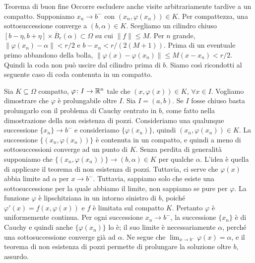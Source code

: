 \documentclass[a4paper]{article}
\begin{document}
\begin{radioactive}
\begin{snippetproof}{Teorema di buon fine}
    Occorre escludere anche visite arbitrariamente tardive a un compatto.
    Supponiamo \(x_n\to b^-\) con \((x_n,\varphi(x_n))\in K\).
    Per compattezza, una sottosuccessione converge a \((b,\alpha)\in K\).
    Scegliamo un cilindro chiuso
    \([b-\eta,b+\eta]\times\overline B_r(\alpha)\subset\Omega\)
    su cui \(\|f\|\leq M\). Per \(n\) grande,
    \(\|\varphi(x_n)-\alpha\|<r/2\) e \(b-x_n<r/(2(M+1))\).
    Prima di un eventuale primo abbandono della bolla,
    \(\|\varphi(x)-\varphi(x_n)\|\leq M(x-x_n)<r/2\).
    Quindi la coda non può uscire dal cilindro prima di \(b\).
    Siamo così ricondotti al seguente caso di coda contenuta in un compatto.

    Sia \(K \subseteq \Omega\) compatto, \(\varphi \colon I \to \mathbb{R}^n\)
    tale che \((x, \varphi(x)) \in K\), \(\forall x \in I\).
    Vogliamo dimostrare che \(\varphi\) è prolungabile oltre \(I\).
    Sia \(I = (a,b)\). Se \(I\) fosse chiuso basta prolungarlo con il problema di Cauchy centrato in \(b\),
    come fatto nella dimostrazione della non esistenza di pozzi.
    Consideriamo una qualunque successione \(\{x_n\} \to b^-\)
    e consideriamo \(\{\varphi(x_n)\}\), quindi \((x_n, \varphi(x_n)) \in K\).
    La successione \(\{(x_n, \varphi(x_n))\}\) è contenuta in un compatto, e quindi
    a meno di sottosuccessioni converge ad un punto di \(K\).
    Senza perdita di generalità supponiamo che \(\{(x_n, \varphi(x_n))\} \to (b, \alpha) \in K\)
    per qualche \(\alpha\). L'idea è quella di applicare il teorema di non esistenza di pozzi.
    Tuttavia, ci serve che \(\varphi(x)\) abbia limite ad \(\alpha\) per \(x \to b^-\).
    Tuttavia, sappiamo solo che esiste una sottosuccessione per la quale abbiamo il limite,
    non sappiamo se pure per \(\varphi\).
    La funzione \(\varphi\) è lipschitziana in un intorno sinistro di \(b\),
    poiché \(\varphi'(x)=f(x,\varphi(x))\) e \(f\) è limitata sul compatto \(K\).
    Pertanto \(\varphi\) è uniformemente continua. Per ogni successione \(x_n\to b^-\),
    la successione \(\{x_n\}\) è di Cauchy e quindi anche \(\{\varphi(x_n)\}\) lo è;
    il suo limite è necessariamente \(\alpha\), perché una sottosuccessione converge già ad \(\alpha\).
    Ne segue che \(\lim_{x\to b^-}\varphi(x)=\alpha\), e il teorema di non esistenza di pozzi
    permette di prolungare la soluzione oltre \(b\), assurdo.
\end{snippetproof}
\end{radioactive}
\end{document}
